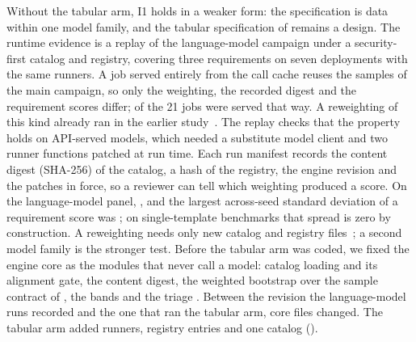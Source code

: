 \ifarmwithdrawn
Without the tabular arm, I1 holds in a weaker form: the specification is data within one model family, and the tabular specification of  remains a design.
The runtime evidence is a replay of the language-model campaign under a security-first catalog and registry, covering three requirements on seven deployments with the same runners.
A job served entirely from the call cache reuses the samples of the main campaign, so only the weighting, the recorded digest and the requirement scores differ;  of the 21 jobs were served that way.
A reweighting of this kind already ran in the earlier study~\apsec.
The replay checks that the property holds on API-served models, which needed a substitute model client and two runner functions patched at run time.
Each run manifest records the content digest (SHA-256) of the catalog, a hash of the registry, the engine revision and the patches in force, so a reviewer can tell which weighting produced a score.
On the language-model panel, , and the largest across-seed standard deviation of a requirement score was ; on single-template benchmarks that spread is zero by construction.
\else
%
A reweighting needs only new catalog and registry files~\apsec; a second model family is the stronger test.
Before the tabular arm was coded, we fixed the engine core as the modules that never call a model: catalog loading and its alignment gate, the content digest, the weighted bootstrap over the sample contract of , the bands and the triage .
Between the revision the language-model runs recorded and the one that ran the tabular arm,  core files changed.
The tabular arm added  runners,  registry entries and one catalog ().

